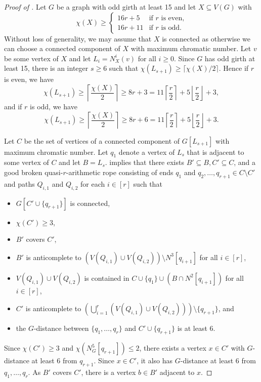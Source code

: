 \documentclass{article}
\begin{document}
\begin{proof}[Proof of ]
    Let $G$ be a graph with odd girth at least 15 and let $X \subseteq V(G)$ with 
    \[\chi(X) \geq \begin{cases}
        16r + 5 & \text{if } r \text{ is even,}\\
        16r + 11 & \text{if } r \text{ is odd.}
    \end{cases}\]
Without loss of generality, we may assume that $X$ is connected as otherwise we can choose a connected component of $X$ with maximum chromatic number. 
Let $v$ be some vertex of $X$ and let $L_i = N^i_X(v)$ for all $i \geq 0$. Since $G$ has odd girth at least 15, there is an integer $s \geq 6$ such that $\chi(L_{s + 1}) \geq \lceil \chi(X) /2 \rceil$.
Hence if $r$ is even, we have
\[
\chi(L_{s + 1}) \geq \left\lceil \frac{\chi(X)}{2} \right \rceil \geq 8r + 3 = 11 \left \lceil \frac{r}{2} \right \rceil + 5 \left \lfloor \frac{r}{2} \right \rfloor + 3,
\]
and if $r$ is odd, we have
\[
\chi(L_{s + 1}) \geq \left\lceil \frac{\chi(X)}{2} \right \rceil \geq 8r + 6 = 11 \left \lceil \frac{r}{2} \right \rceil + 5 \left \lfloor \frac{r}{2} \right \rfloor + 3.
\]

Let $C$ be the set of vertices of a connected component of $G[L_{s + 1}]$ with maximum chromatic number. Let $q_1$ denote a vertex of $L_s$ that is adjacent to some vertex of $C$ and let $B = L_s$.  implies that there exists $B' \subseteq B, C' \subseteq C$, and a good broken quasi-$r$-arithmetic rope consisting of ends $q_1$ and $q_2, \dots, q_{r + 1} \in C \setminus C'$ and paths $Q_{i, 1}$ and $Q_{i, 2}$ for each $i \in [r]$ such that 
\begin{itemize}
    \item $G[C' \cup \{q_{r+ 1} \}]$ is connected,
    \item $\chi(C') \geq 3$,
    \item $B'$ covers $C'$,
    \item $B'$ is anticomplete to $(V(Q_{i, 1}) \cup V(Q_{i, 2})) \setminus N^3[q_{i + 1}]$ for   all $i \in [r]$,
    \item $V(Q_{i, 1}) \cup V(Q_{i, 2})$ is contained in $C \cup \{q_1\} \cup (B \cap N^2[q_{i + 1}])$ for all $i \in [r]$,
    \item $C'$ is anticomplete to $\left( \bigcup_{i = 1}^r (V(Q_{i, 1}) \cup V(Q_{i, 2})) \right) \setminus \{q_{r + 1}\}$, and
    \item the $G$-distance between $\{q_1, \dots, q_{r}\}$ and $C' \cup \{q_{ r+  1}\}$ is at least $6$. 
\end{itemize}
Since $\chi(C') \geq 3$ and $\chi(N^5_G[q_{r + 1}]) \leq 2$, there exists a vertex $x \in C'$ with $G$-distance at least $6$ from $q_{r + 1}$. Since $x \in C'$, it also has $G$-distance at least $6$ from $q_1, \dots, q_r$. As $B'$ covers $C'$, there is a vertex $b \in B'$ adjacent to $x$. 


\end{proof}
\end{document}
